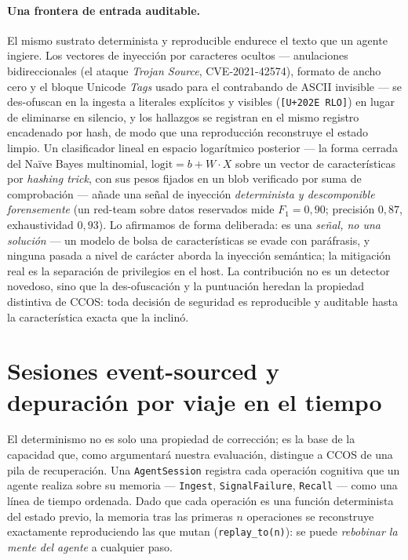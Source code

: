 \documentclass[11pt]{article}
\newcommand{\code}[1]{\texttt{#1}}
\begin{document}
\paragraph{Una frontera de entrada auditable.} El mismo sustrato determinista y
reproducible endurece el texto que un agente ingiere. Los vectores de inyección
por caracteres ocultos --- anulaciones bidireccionales (el ataque \emph{Trojan
Source}, CVE-2021-42574), formato de ancho cero y el bloque Unicode \emph{Tags}
usado para el contrabando de ASCII invisible --- se des-ofuscan en la ingesta a
literales explícitos y visibles (\code{[U+202E RLO]}) en lugar de eliminarse en
silencio, y los hallazgos se registran en el mismo registro encadenado por hash,
de modo que una reproducción reconstruye el estado limpio. Un clasificador lineal
en espacio logarítmico posterior --- la forma cerrada del Naïve Bayes multinomial,
$\mathrm{logit}=b+W\!\cdot\!X$ sobre un vector de características por \emph{hashing
trick}, con sus pesos fijados en un blob verificado por suma de comprobación ---
añade una señal de inyección \emph{determinista y descomponible forensemente} (un
red-team sobre datos reservados mide $F_1=0{,}90$; precisión $0{,}87$,
exhaustividad $0{,}93$). Lo afirmamos de forma deliberada: es una \emph{señal, no
una solución} --- un modelo de bolsa de características se evade con paráfrasis, y
ninguna pasada a nivel de carácter aborda la inyección semántica; la mitigación
real es la separación de privilegios en el host. La contribución no es un detector
novedoso, sino que la des-ofuscación y la puntuación heredan la propiedad
distintiva de CCOS: toda decisión de seguridad es reproducible y auditable hasta
la característica exacta que la inclinó.

\section{Sesiones event-sourced y depuración por viaje en el tiempo}\label{sec:timetravel}

El determinismo no es solo una propiedad de corrección; es la base de la capacidad
que, como argumentará nuestra evaluación, distingue a CCOS de una pila de
recuperación. Una \code{AgentSession} registra cada operación cognitiva que un agente
realiza sobre su memoria --- \code{Ingest}, \code{SignalFailure}, \code{Recall} ---
como una línea de tiempo ordenada. Dado que cada operación es una función determinista
del estado previo, la memoria tras las primeras $n$ operaciones se reconstruye
exactamente reproduciendo las que mutan (\code{replay\_to(n)}): se puede
\emph{rebobinar la mente del agente} a cualquier paso.
\end{document}
